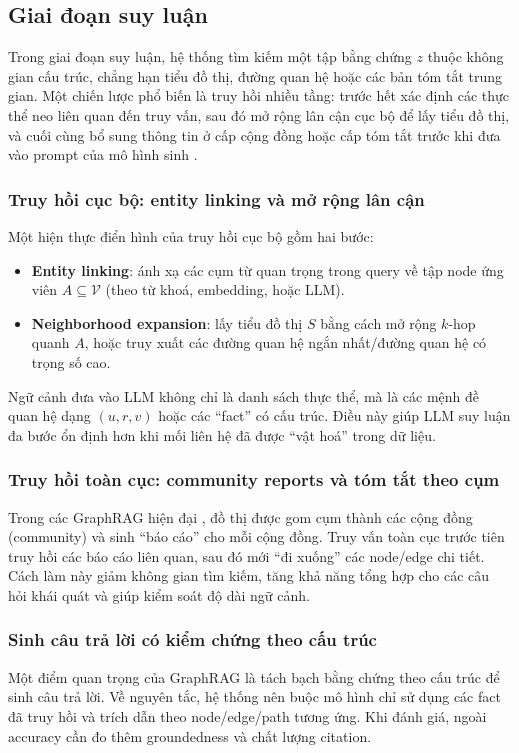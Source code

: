 \documentclass[a4paper,12pt,twoside]{report}
\begin{document}
\subsection{Giai đoạn suy luận}
Trong giai đoạn suy luận, hệ thống tìm kiếm một tập bằng chứng \(z\) thuộc không gian cấu trúc, chẳng hạn tiểu đồ thị, đường quan hệ hoặc các bản tóm tắt trung gian. Một chiến lược phổ biến là truy hồi nhiều tầng: trước hết xác định các thực thể neo liên quan đến truy vấn, sau đó mở rộng lân cận cục bộ để lấy tiểu đồ thị, và cuối cùng bổ sung thông tin ở cấp cộng đồng hoặc cấp tóm tắt trước khi đưa vào prompt của mô hình sinh \cite{edge2024}.

\subsubsection{Truy hồi cục bộ: entity linking và mở rộng lân cận}
Một hiện thực điển hình của truy hồi cục bộ gồm hai bước:
\begin{itemize}[nosep]
  \item \textbf{Entity linking}: ánh xạ các cụm từ quan trọng trong query về tập node ứng viên \(A\subseteq\mathcal{V}\) (theo từ khoá, embedding, hoặc LLM).
  \item \textbf{Neighborhood expansion}: lấy tiểu đồ thị \(S\) bằng cách mở rộng \(k\)-hop quanh \(A\), hoặc truy xuất các đường quan hệ ngắn nhất/đường quan hệ có trọng số cao.
\end{itemize}
Ngữ cảnh đưa vào LLM không chỉ là danh sách thực thể, mà là các mệnh đề quan hệ dạng \((u,r,v)\) hoặc các ``fact'' có cấu trúc. Điều này giúp LLM suy luận đa bước ổn định hơn khi mối liên hệ đã được ``vật hoá'' trong dữ liệu.

\subsubsection{Truy hồi toàn cục: community reports và tóm tắt theo cụm}
Trong các GraphRAG hiện đại \cite{edge2024}, đồ thị được gom cụm thành các cộng đồng (community) và sinh ``báo cáo'' cho mỗi cộng đồng. Truy vấn toàn cục trước tiên truy hồi các báo cáo liên quan, sau đó mới ``đi xuống'' các node/edge chi tiết. Cách làm này giảm không gian tìm kiếm, tăng khả năng tổng hợp cho các câu hỏi khái quát và giúp kiểm soát độ dài ngữ cảnh.

\subsubsection{Sinh câu trả lời có kiểm chứng theo cấu trúc}
Một điểm quan trọng của GraphRAG là tách bạch bằng chứng theo cấu trúc để sinh câu trả lời. Về nguyên tắc, hệ thống nên buộc mô hình chỉ sử dụng các fact đã truy hồi và trích dẫn theo node/edge/path tương ứng. Khi đánh giá, ngoài accuracy cần đo thêm groundedness và chất lượng citation.
\end{document}
